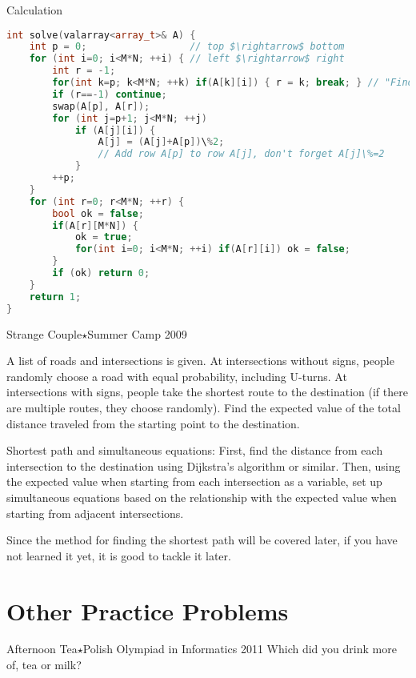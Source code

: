 \begin{versionbeta}
Calculation
\begin{cbox}
\begin{lstlisting}[language=C++]
int solve(valarray<array_t>& A) {
    int p = 0;                  // top $\rightarrow$ bottom
    for (int i=0; i<M*N; ++i) { // left $\rightarrow$ right
        int r = -1;
        for(int k=p; k<M*N; ++k) if(A[k][i]) { r = k; break; } // "Find row where A[r][i]!=0 after position p"
        if (r==-1) continue;
        swap(A[p], A[r]);
        for (int j=p+1; j<M*N; ++j)
            if (A[j][i]) {
                A[j] = (A[j]+A[p])\%2;
                // Add row A[p] to row A[j], don't forget A[j]\%=2
            }
        ++p;
    }
    for (int r=0; r<M*N; ++r) {
        bool ok = false;
        if(A[r][M*N]) {
            ok = true;
            for(int i=0; i<M*N; ++i) if(A[r][i]) ok = false;
        }
        if (ok) return 0;
    }
    return 1;
}
\end{lstlisting}
\end{cbox}


\begin{pbox}{Strange Couple$\star$}{Summer Camp 2009}

A list of roads and intersections is given. At intersections without signs, people randomly choose a road with equal probability, including U-turns. At intersections with signs, people take the shortest route to the destination (if there are multiple routes, they choose randomly). Find the expected value of the total distance traveled from the starting point to the destination.

\end{pbox}

Shortest path and simultaneous equations:
First, find the distance from each intersection to the destination using Dijkstra's algorithm or similar. Then, using the expected value when starting from each intersection as a variable, set up simultaneous equations based on the relationship with the expected value when starting from adjacent intersections.

Since the method for finding the shortest path will be covered later, if you have not learned it yet, it is good to tackle it later.
\section{Other Practice Problems}

\begin{pbox}{Afternoon Tea$\star$}{Polish Olympiad in Informatics 2011}
Which did you drink more of, tea or milk?


\end{pbox}
\end{versionbeta}

